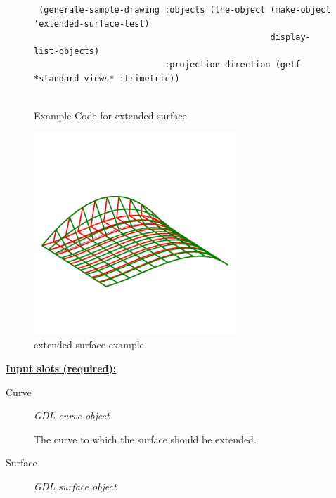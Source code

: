 \documentclass [11pt]{book}
\begin{document}
\begin{itemize}
\begin{figure}
\begin{lrbox}{\boxedverb}
\begin{minipage}{\linewidth}
{\begin{verbatim}
 (generate-sample-drawing :objects (the-object (make-object 'extended-surface-test)
                                               display-list-objects)
                          :projection-direction (getf *standard-views* :trimetric))


\end{verbatim}}
\end{minipage}
\end{lrbox}
\fbox{\usebox{\boxedverb}}

\caption{Example Code for extended-surface}

\label{fig:example-code-extended-surface}

\end{figure}

\begin{figure}
\begin{center}
\includegraphics[width=3in,height=3in]{../images/example-extended-surface.pdf}
\end{center}

\caption{extended-surface example}

\label{fig:extended-surface}

\end{figure}





\textbf{
\underline{Input slots (required):}}

\begin{description}

\item [Curve]
\emph{GDL curve object}

 The curve to which the surface should be extended.




\item [Surface]
\emph{GDL surface object}


\end{description}
\end{itemize}
\end{document}
